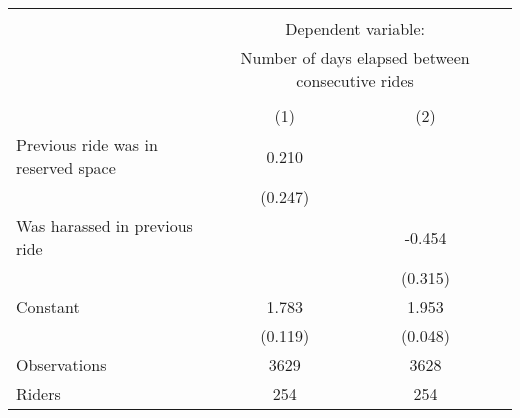 {\begin{tabular}{lccc} \hline\hline \\[-1.8ex] & \multicolumn{2}{c}{Dependent variable:} \\ & \multicolumn{2}{c}{Number of days elapsed between consecutive rides} \\ \\[-1.8ex]
                    &\multicolumn{1}{c}{(1)}         &\multicolumn{1}{c}{(2)}         \\
\hline
Previous ride was in reserved space&       0.210         &                     \\
                    &     (0.247)         &                     \\
[1em]
Was harassed in previous ride&                     &      -0.454         \\
                    &                     &     (0.315)         \\
[1em]
Constant            &       1.783\sym{***}&       1.953\sym{***}\\
                    &     (0.119)         &     (0.048)         \\
\hline
Observations        &        3629         &        3628         \\
Riders              &         254         &         254         \\
\hline\hline
\end{tabular}
}
